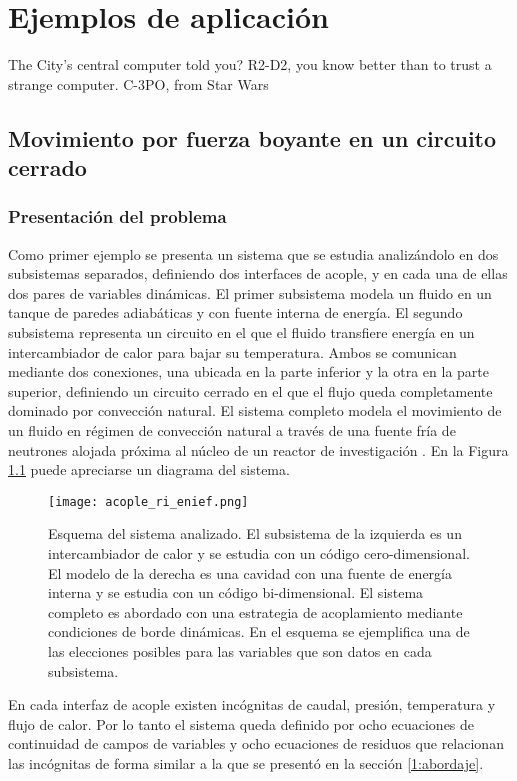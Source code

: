 \chapter{Ejemplos de aplicación}
\label{chap3}
\chapterquote
{The City's central computer told you? R2-D2, you know better than to trust a strange computer. }
{C-3PO, from Star Wars}

\section{Movimiento por fuerza boyante en un circuito cerrado}
\label{3:ff}

\subsection*{Presentación del problema}
Como primer ejemplo se presenta un sistema que se estudia analizándolo en dos subsistemas separados,
definiendo dos interfaces de acople,
y en cada una de ellas dos pares de variables dinámicas.
El primer subsistema modela un fluido en un tanque de paredes adiabáticas y con fuente interna de energía. 
El segundo subsistema representa un circuito en el que el fluido transfiere energía en un intercambiador de calor para bajar su temperatura.
Ambos se comunican mediante dos conexiones, una ubicada en la parte inferior y la otra en la parte superior,
definiendo un circuito cerrado en el que el flujo queda completamente dominado por convección natural.
El sistema completo modela el movimiento de un fluido en régimen de convección natural a través de
una fuente fría de neutrones alojada próxima al núcleo de un reactor de investigación \cite{fuente-fria}.
En la Figura \ref{esquemaFuenteFria} puede apreciarse un diagrama del sistema.

\begin{figure}['ht]
\centering{}\texttt{[image: acople\_ri\_enief.png]}
\caption{Esquema del sistema analizado. 
El subsistema de la izquierda es un intercambiador de calor y se estudia con un código cero-dimensional.
El modelo de la derecha es una cavidad con una fuente de energía interna y se estudia con un código bi-dimensional.
El sistema completo es abordado con una estrategia de acoplamiento mediante condiciones de borde dinámicas.
En el esquema se ejemplifica una de las elecciones posibles para las variables que son datos en cada subsistema.}
\label{esquemaFuenteFria}
\end{figure}

En cada interfaz de acople existen incógnitas de caudal, presión, temperatura y flujo de calor. 
Por lo tanto el sistema queda definido por ocho ecuaciones de continuidad de campos de variables 
y ocho ecuaciones de residuos que relacionan las incógnitas de forma similar 
a la que se presentó en la sección \ref{1:abordaje}.


